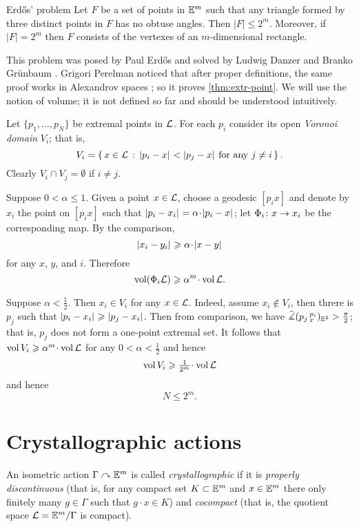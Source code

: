 \begin{thm}{Erd\H{o}s' problem}
Let $F$ be a set of points in $\mathbb{E}^m$ such that any triangle formed by three distinct points in $F$ has no obtuse angles.
Then  $|F|\le2^m$.
Moreover, if $|F|=2^m$ then $F$ consists of the vertexes of an $m$-dimensional rectangle.
\end{thm}

This problem was posed by Paul Erd\H{o}s  \cite{erdos} and solved by Ludwig Danzer and Branko Gr\"unbaum \cite{danzer-gruenbaum}.
Grigori Perelman noticed that after proper definitions, the same proof works in Alexandrov spaces \cite{perelman-Erdos}; so it proves \ref{thm:extr-point}.
We will use the notion of volume;
it is not defined so far and should be understood intuitively.

Let $\{p_1,\dots,p_N\}$ be extremal points in $\mathcal{L}$.
For each $p_i$ consider its open \emph{Voronoi domain} $V_i$; that is, 
\[V_i=\set{x\in \spc{L}}{\dist{p_i}{x}{}<\dist{p_j}{x}{}\ \text{for any}\ j\not=i}.\]
Clearly $V_i\cap V_j=\emptyset$ if $i\not=j$.

Suppose  $0<\alpha\le 1$.
Given a point $x\in\mathcal{L}$, choose a geodesic $[p_ix]$ and denote by $x_i$ the point on $[p_ix]$ such that $\dist{p_i}{x_i}{}=\alpha\cdot\dist{p_i}{x}{}$;
let $\Phi_i\colon x\to x_i$ be the corresponding map.
By the comparison, 
\[\dist{x_i}{y_i}{}\ge\alpha\cdot \dist{x}{y}{}\]
for any $x$, $y$, and $i$.
Therefore 
\[\vol(\map_i \spc{L})\ge\alpha^m\cdot\vol \spc{L}.\]

Suppose $\alpha<\tfrac12$.
Then $x_i\in V_i$ for any $x\in \mathcal{L}$.
Indeed, assume $x_i\notin V_i$,
then threre is $p_j$ such that $\dist{p_i}{x_i}{}\ge\dist{p_j}{x_i}{}$.
Then from comparison, we have $\tilde\measuredangle(p_j\,{}^{p_i}_{x})_{\mathbb{E}^2}>\tfrac\pi2$;
that is, $p_j$ does not form a one-point extremal set.
It follows that $\vol V_i\ge\alpha^m\cdot\vol \spc{L}$
for any $0<\alpha<\tfrac12$ and hence 
\[\vol V_i\ge\tfrac1{2^m}\cdot\vol \spc{L}\]
and hence 
\[N\le 2^m.\]
\qedsf

\section{Crystallographic actions}


An isometric action $\Gamma\curvearrowright \mathbb{E}^m$ is called \emph{crystallographic} if it is 
\emph{properly discontinuous} (that is, for any compact set $K\subset \mathbb{E}^m$ and $x\in \mathbb{E}^m$ there only finitely many $g\in \Gamma$ such that $g\cdot x\in K$) and \emph{cocompact} (that is, the quotient space $\mathcal{L}=\mathbb{E}^m/\Gamma$ is compact).

